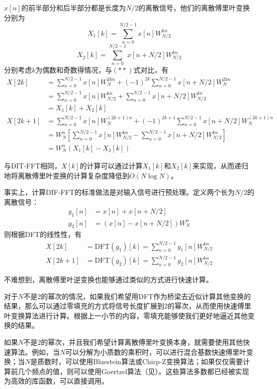 $x[n]$的前半部分和后半部分都是长度为$N/2$的离散信号，他们的离散傅里叶变换分别为$$X_1[k]=\sum_{n=0}^{N/2-1}x[n]W_{N/2}^{kn}$$
$$X_2[k]=\sum_{n=0}^{N/2-1}x[n+N/2]W_{N/2}^{kn}$$
分别考虑$k$为偶数和奇数得情况，与$(**)$式对比，有
\begin{align*}
X[2k]&=\sum_{n=0}^{N/2-1}x[n]W_N^{2kn}+(-1)^{2k}\sum_{n=0}^{N/2-1}x[n+N/2]W_N^{2kn}\\
&=\sum_{n=0}^{N/2-1}x[n]W_{N/2}^{kn}+\sum_{n=0}^{N/2-1}x[n+N/2]W_{N/2}^{kn}\\
&=X_1[k]+X_2[k]\\
X[2k+1]&=\sum_{n=0}^{N/2-1}x[n]W_N^{(2k+1)n}+(-1)^{2k+1}\sum_{n=0}^{N/2-1}x[n+N/2]W_N^{(2k+1)n}\\
&=W_{N}^n\left[\sum_{n=0}^{N/2-1}x[n]W_{N/2}^{kn}-\sum_{n=0}^{N/2-1}x[n+N/2]W_{N/2}^{kn}\right]\\
&=W_N^n(X_1[k]-X_2[k])
\end{align*}

与DIT-FFT相同，$X[k]$的计算可以通过计算$X_1[k]$和$X_2[k]$来实现，从而递归地将离散傅里叶变换的计算复杂度降低到$O(N\log N)$。

事实上，计算DIF-FFT的标准做法是对输入信号进行预处理。定义两个长为$N/2$的离散信号：
\begin{align*}
    g_1[n]&=x[n]+x[n+N/2]\\
    g_2[n]&=(x[n]-x[n+N/2])W_N^n
\end{align*}
则根据DFT的线性性，有
\begin{align*}
    X[2k]&=\mathrm{DFT}(g_1)[k]=\sum_{n=0}^{N/2-1}g_1[n]W_{N/2}^{kn}\\
    X[2k+1]&=\mathrm{DFT}(g_2)[k]=\sum_{n=0}^{N/2-1}g_2[n]W_{N/2}^{kn}
\end{align*}

不难想到，离散傅里叶逆变换也能够通过类似的方式进行快速计算。

对于$N$不是$2$的幂次的情况，如果我们希望用DFT作为桥梁去近似计算其他变换的结果，那么可以通过零填充的方式将信号长度扩展到$2$的幂次，从而使用快速傅里叶变换算法进行计算。根据上一小节的内容，零填充能够使我们更好地逼近其他变换的结果。

如果$N$不是$2$的幂次，并且我们希望计算离散傅里叶变换本身，就需要使用其他快速算法。例如，当$N$可以分解为小质数的乘积时，可以进行混合基数快速傅里叶变换；当$N$是质数时，可以使用Bluestein算法或Chirp-Z变换算法；如果仅仅需要计算前几个频点的值，则可以使用Goertzel算法（见\cite{dsp}）。这些算法多数都已经被实现为高效的库函数，可以直接调用。